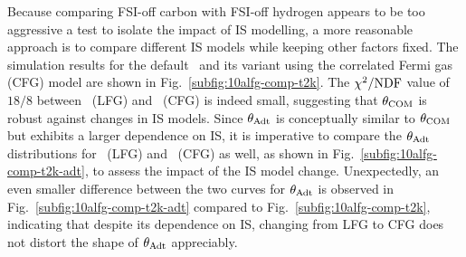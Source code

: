      Because comparing FSI-off carbon with FSI-off hydrogen appears to be too aggressive a test to isolate the impact of IS modelling, a more reasonable approach is to compare different IS models while keeping other factors fixed.
     The simulation results for the default \geta\ and its variant using the correlated Fermi gas (CFG) model are shown in Fig.~\ref{subfig:10alfg-comp-t2k}.
     The $\chi^2/{\textrm{NDF}}$ value of $18/8$ between \geta\ (LFG) and \geta\ (CFG) is indeed small, suggesting that $\theta_{\textrm{COM}}$ is robust against changes in IS models.
     Since $\theta_{\textrm{Adt}}$ is conceptually similar to $\theta_{\textrm{COM}}$ but exhibits a larger dependence on IS, it is imperative to compare the $\theta_{\textrm{Adt}}$ distributions for \geta\ (LFG) and \geta\ (CFG) as well, as shown in Fig.~\ref{subfig:10alfg-comp-t2k-adt}, to assess the impact of the IS model change.
     Unexpectedly, an even smaller difference between the two curves for $\theta_{\textrm{Adt}}$ is observed in Fig.~\ref{subfig:10alfg-comp-t2k-adt} compared to Fig.~\ref{subfig:10alfg-comp-t2k}, indicating that despite its dependence on IS, changing from LFG to CFG does not distort the shape of $\theta_{\textrm{Adt}}$ appreciably.

